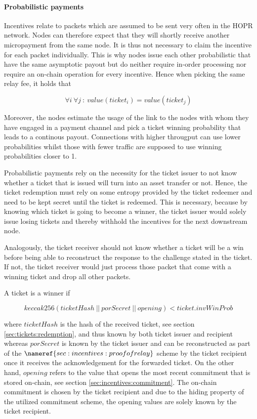 \paragraph{Probabilistic payments}
\label{sec:incentives:probabilistic:probabilistic}

Incentives relate to packets which are assumed to be sent very often in the HOPR network. Nodes can therefore expect that they will shortly receive another micropayment from the same node. It is thus not necessary to claim the incentive for each packet individually. This is why nodes issue each other probabilistic  that have the same asymptotic payout but do neither require in-order processing nor require an on-chain operation for every incentive. Hence when picking the same relay fee, it holds that

$$ \forall i \ \forall j \ : \ value(ticket_i) = value(ticket_j) $$

Moreover, the nodes estimate the usage of the link to the nodes with whom they have engaged in a payment channel and pick a ticket winning probability that leads to a continous payout. Connections with higher througput can use lower probabilities whilst those with fewer traffic are supposed to use winning probabilities closer to 1.

Probabilistic payments rely on the necessity for the ticket issuer to not know whether a ticket that is issued will turn into an asset transfer or not. Hence, the ticket redemption must rely on some entropy provided by the ticket redeemer and need to be kept secret until the ticket is redeemed. This is necessary, because by knowing which ticket is going to become a winner, the ticket issuer would solely issue losing tickets and thereby withhold the incentives for the next downstream node.

Analogously, the ticket receiver should not know whether a ticket will be a win before being able to reconstruct the response to the challenge stated in the ticket. If not, the ticket receiver would just process those packet that come with a winning ticket and drop all other packets.

A ticket is a winner if

$$ keccak256 ( ticketHash \ || \ porSecret \ || \ opening) < ticket.invWinProb $$

where $ticketHash$ is the hash of the received ticket, see section \ref{sec:tickets:redemption}, and thus known by both ticket issuer and recipient whereas $porSecret$ is known by the ticket issuer and can be reconstructed as part of the $\nameref{sec:incentives:proofofrelay}$ scheme by the ticket recipient once it receives the acknowledgement for the forwarded ticket. On the other hand, $opening$ refers to the value that opens the most recent commitment that is stored on-chain, see section \ref{sec:incentives:commitment}. The on-chain commitment is chosen by the ticket recipient and due to the hiding property of the utilized commitment scheme, the opening values are solely known by the ticket recipient.